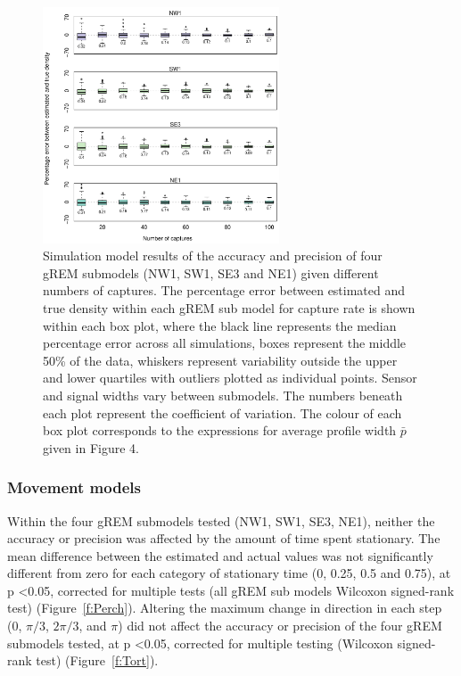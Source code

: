 \documentclass[a4paper,10pt,reqno,oneside]{amsart}
\begin{document}
\begin{figure}[t]
       \centering
	\includegraphics[width=7cm]{imgs/ResultsNoCaptures.pdf}
        \caption{Simulation model results of the accuracy and precision of four gREM submodels (NW1, SW1, SE3 and NE1) given different numbers of captures. The percentage error between estimated and true density within each gREM sub model for capture rate is shown within each box plot, where the black line represents the median percentage error across all simulations, boxes represent the middle 50\% of the data, whiskers represent variability outside the upper and lower quartiles with outliers plotted as individual points. Sensor and signal widths vary between submodels. The numbers beneath each plot represent the coefficient of variation. The colour of each box plot corresponds to the expressions for average profile width $\bar{p}$ given in Figure 4. }            
	\label{f:Captures}
\end{figure}


\subsubsection*{Movement models}

Within the four gREM submodels tested (NW1, SW1, SE3, NE1), neither the accuracy or precision was affected by the amount of time spent stationary. The mean difference between the estimated and actual values was not significantly different from zero for each category of stationary time (0, 0.25, 0.5 and 0.75), at p \textless 0.05, corrected for multiple tests (all gREM sub models Wilcoxon signed-rank test) (Figure~\ref{f:Perch}). Altering the maximum change in direction in each step (0, $\pi/3$, $2\pi/3$, and $\pi$) did not affect the accuracy or precision of the four gREM submodels tested, at p \textless 0.05, corrected for multiple testing (Wilcoxon signed-rank test) (Figure~\ref{f:Tort}). 
\end{document}
